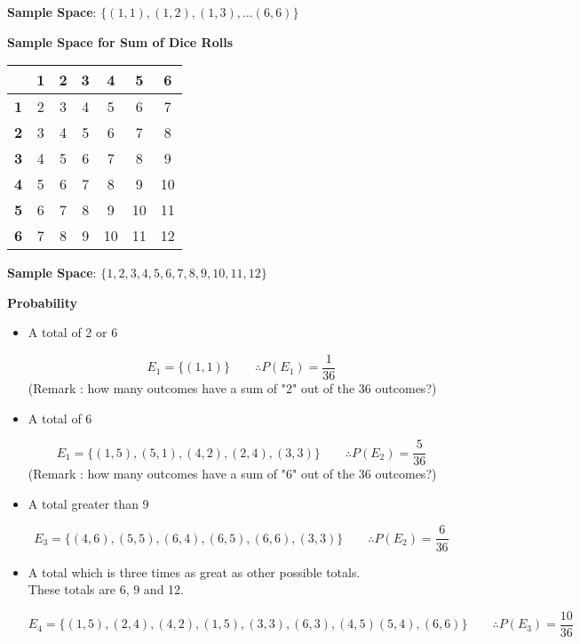 \documentclass[]{report}
\begin{document}
{{{{{\noindent \textbf{Sample Space}: $\{ (1,1),(1,2),(1,3), \ldots (6,6)\}$
}
\bigskip

\noindent \textbf{Sample Space for Sum of Dice Rolls}

{

\begin{center}
\begin{tabular}{|c||c|c|c|c|c|c|}
\hline
\phantom{space}& \phantom{sp} \textbf{1}\phantom{sp}&\phantom{sp} \textbf{2}\phantom{sp}&\phantom{sp} \textbf{3}\phantom{sp}&\phantom{sp} \textbf{4}\phantom{sp}&\phantom{sp} \textbf{5} \phantom{sp}&\phantom{sp}\textbf{6}\phantom{sp}\\ \hline\hline
\textbf{1}&2&3&4&5&6&7 \\ \hline
\textbf{2}&3&4&5&6&7&8 \\ \hline
\textbf{3}&4&5&6&7&8&9 \\ \hline
\textbf{4}&5&6&7&8&9&10 \\ \hline
\textbf{5}&6&7&8&9&10&11 \\ \hline
\textbf{6}&7&8&9&10&11&12 \\ \hline
\end{tabular}
\end{center}


\noindent \textbf{Sample Space}: $\{ 1,2,3,4,5,6,7,8,9,10,11,12\}$
}


\noindent \textbf{Probability}

\begin{itemize}
\item A total of 2 or 6

\[ E_1 = \{ (1,1) \} \qquad \therefore  P(E_1)  = \frac{1}{36} \]
(Remark : how many outcomes have a sum of "2" out of the 36 outcomes?)
\medskip
\item A total of  6

\[ E_1 = \{ (1,5), (5,1), (4,2), (2,4), (3,3) \} \qquad \therefore  P(E_2)  = \frac{5}{36} \]
(Remark : how many outcomes have a sum of "6" out of the 36 outcomes?)
\medskip
\item A total greater than 9 

\[ E_3 = \{ (4,6) , (5,5), (6,4), (6,5), (6,6), (3,3)\} \qquad \therefore P(E_2)  = \frac{6}{36} \]
\medskip
\item  A total which is three times as great as other possible totals. \\

These totals are 6, 9 and 12.

\[ E_4 = \{ (1,5) , (2,4), (4,2), (1,5), (3,3), (6,3), (4,5) (5,4) , (6,6) \} \qquad \therefore  P(E_3)  = \frac{10}{36} \]


\end{itemize}}}}}
\end{document}
